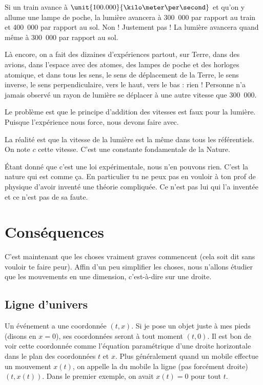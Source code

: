 Si un train avance à $\unit{100.000}{\kilo\meter\per\second}$ et qu'on y allume une lampe de poche, la lumière avancera à \unit{300.000}{\kilo\meter\per\second} par rapport au train et \unit{400.000}{\kilo\meter\per\second} par rapport au sol. Non ! Justement pas ! La lumière avancera quand même à \unit{300.000}{\kilo\meter\per\second} par rapport au sol.

Là encore, on a fait des dizaines d'expériences partout, sur Terre, dans des avions, dans l'espace avec des atomes, des lampes de poche et des horloges atomique, et dans tous les sens, le sens de déplacement de la Terre, le sens inverse, le sens perpendiculaire, vers le haut, vers le bas : rien ! Personne n'a jamais observé un rayon de lumière se déplacer à une autre vitesse que \unit{300.000}{\kilo\meter\per\second}.

Le problème est que le principe d'addition des vitesses est faux pour la lumière. Puisque l'expérience nous force, nous devons faire avec.

\begin{loiphyz}		\label{LoiVitLum}
La réalité est que la vitesse de la lumière est la même dans tous les référentiels. On note $c$ cette vitesse. C'est une constante fondamentale de la Nature.
\end{loiphyz}
Étant donné que c'est une loi expérimentale, nous n'en pouvons rien. C'est la nature qui est comme ça. En particulier tu ne peux pas en vouloir à ton prof de physique d'avoir inventé une théorie compliquée. Ce n'est pas lui qui l'a inventée et ce n'est pas de sa faute.


\section{Conséquences}

C'est maintenant que les choses vraiment graves commencent (cela soit dit sans vouloir te faire peur). Affin d'un peu simplifier les choses, nous n'allons  étudier que les mouvements en une dimension, c'est-à-dire sur une droite.

\subsection{Ligne d'univers}

Un événement a une coordonnée $(t,x)$. Si je pose un objet juste à mes pieds (disons en $x=0$), ses coordonnées seront à tout moment $(t,0)$. Il est bon de voir cette coordonnée comme l'équation paramétrique d'une droite horizontale dans le plan des coordonnées $t$ et $x$. Plus généralement quand un mobile effectue un mouvement $x(t)$, on appelle la  du mobile la ligne (pas forcément droite) $(t,x(t))$. Dans le premier exemple, on avait $x(t)=0$ pour tout $t$.

